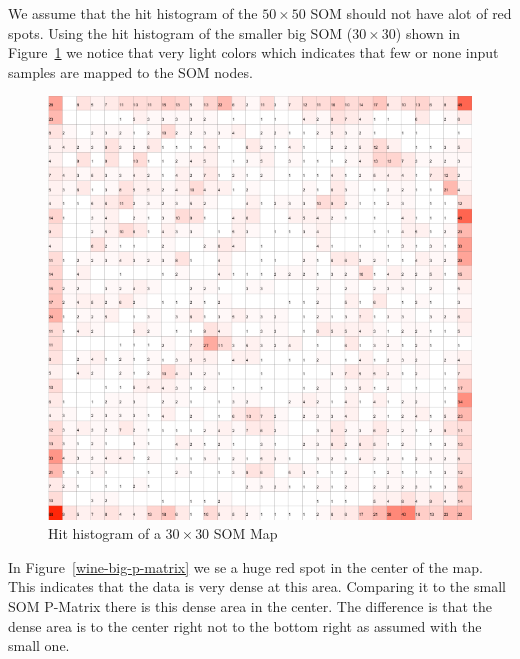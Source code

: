 \documentclass{acm_proc_article-sp}
\begin{document}
We assume that the hit histogram of the $50\times50$ SOM should not have alot of red spots.
Using the hit histogram of the smaller big SOM ($30\times30$) shown in Figure~\ref{fig:wine-big-hit-histogram} we notice that very light
colors which indicates that few or none input samples are mapped to the SOM nodes.

\begin{figure}
\centering
\includegraphics[width=\linewidth]{img/wine-big-hit-histogram}
\caption{Hit histogram of a $30\times30$ SOM Map}
\label{fig:wine-big-hit-histogram}
\end{figure}

In Figure~\ref{wine-big-p-matrix} we se a huge red spot in the center of the map. This indicates that
the data is very dense at this area. Comparing it to the small SOM P-Matrix there is this dense area
in the center. The difference is that the dense area is to the center right not to the bottom right as assumed with
the small one.
\end{document}
